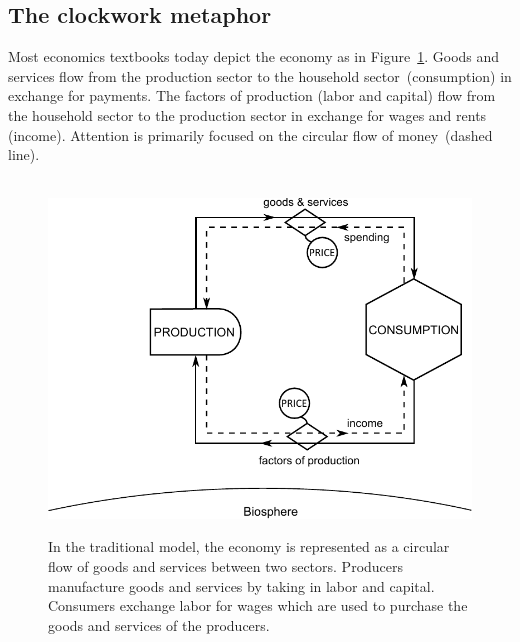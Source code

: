 \subsection{The clockwork metaphor}
\label{sec:clockwork_metaphor}

Most economics textbooks today depict the economy 
as in Figure~\ref{fig:perp_motion_1}.
Goods and services flow from the production sector
to the household sector~(consumption)
in exchange for payments.
The factors of production (labor and capital)
flow from the household sector to the
production sector in exchange for wages and rents (income).
Attention is primarily focused on the circular flow
of money~(dashed line).

\begin{figure}[!ht]
\centering\
\includegraphics[width=\linewidth]{Part_0/Chapter_Introduction/images/Perpetual_motion_1.pdf}
\caption[The traditional model]{In the traditional model, the economy 
is represented as a circular flow of goods and services between two sectors. 
Producers manufacture goods and services 
by taking in labor and capital. 
Consumers exchange labor for wages 
which are used to purchase 
the goods and services of the producers.}
\label{fig:perp_motion_1}
\end{figure}


